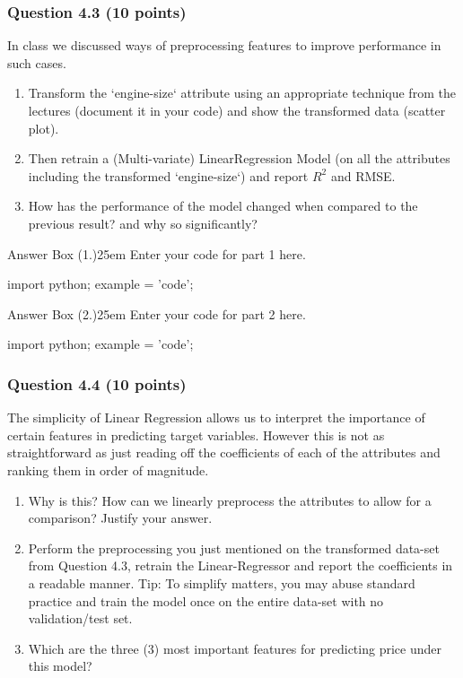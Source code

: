 \documentclass[12pt]{article}
\begin{document}
\subsubsection*{Question 4.3 (10 points)}
In class we discussed ways of preprocessing features to improve performance in such cases.
\begin{enumerate}
    \item [1.] [Code] Transform the `engine-size` attribute using an appropriate technique from the lectures (document it in your code) and show the transformed data (scatter plot).
    \item [2.] [Code] Then retrain a (Multi-variate) LinearRegression Model (on all the attributes including the transformed `engine-size`) and report $R^2$ and RMSE. 
    \item [3.] [Text] How has the performance of the model changed when compared to the previous result? and why so significantly?
\end{enumerate}

\begin{code}{Answer Box (1.)}{25em}
    Enter your code for part 1 here.

    import python;
    example = 'code';
\end{code}


\begin{code}{Answer Box (2.)}{25em}
    Enter your code for part 2 here.

    import python;
    example = 'code';
\end{code}






\subsubsection*{Question 4.4 (10 points)}
The simplicity of Linear Regression allows us to interpret the importance of certain features in predicting target variables. However this is not as straightforward as just reading off the coefficients of each of the attributes and ranking them in order of magnitude.

\begin{enumerate}
    \item[1] [Text] Why is this? How can we linearly preprocess the attributes to allow for a comparison? Justify your answer.
    \item[2] [Code] Perform the preprocessing you just mentioned on the transformed data-set from Question 4.3, retrain the Linear-Regressor and report the coefficients in a readable manner. Tip: To simplify matters, you may abuse standard practice and train the model once on the entire data-set with no validation/test set.
    \item[3] [Text] Which are the three (3) most important features for predicting price under this model?
\end{enumerate}
\end{document}
